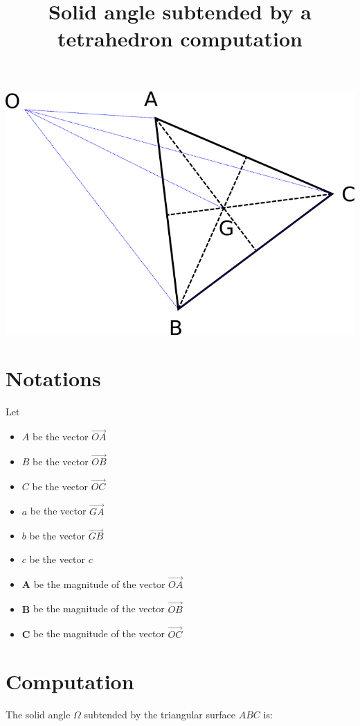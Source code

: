 \documentclass[10pt,a4paper]{article}
\title{Solid angle subtended by a tetrahedron computation}
\begin{document}
\maketitle


\includegraphics[scale=0.4]{tetra.png}


\section{Notations}

Let

\begin{itemize}
	\item $A$ be the vector $\vec{OA}$
	\item $B$ be the vector $\vec{OB}$
	\item $C$ be the vector $\vec{OC}$
	\item $a$ be the vector $\vec{GA}$
	\item $b$ be the vector $\vec{GB}$
	\item $c$ be the vector $c$
	\item $\mathbf{A}$ be the magnitude of the vector $\vec{OA}$
	\item $\mathbf{B}$ be the magnitude of the vector $\vec{OB}$
	\item $\mathbf{C}$ be the magnitude of the vector $\vec{OC}$
\end{itemize}

\section{Computation}

The solid angle $\Omega$ subtended by the triangular surface $ABC$ is:
\end{document}
